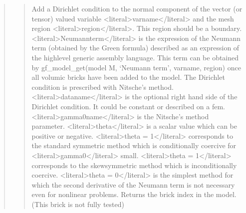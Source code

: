 \documentclass[a4paper,11pt,english]{sphinxmanual}
\begin{document}
\begin{quote}
\begin{quote}
\sphinxAtStartPar
Add a Dirichlet condition to the normal component of the vector
(or tensor) valued variable \textless{}literal\textgreater{}varname\textless{}/literal\textgreater{} and the mesh region \textless{}literal\textgreater{}region\textless{}/literal\textgreater{}.
This region should be a boundary. \textless{}literal\textgreater{}Neumannterm\textless{}/literal\textgreater{}
is the expression of the Neumann term (obtained by the Green formula)
described as an expression of the high\sphinxhyphen{}level
generic assembly language. This term can be obtained by
gf\_model\_get(model M, ‘Neumann term’, varname, region) once all volumic bricks have
been added to the model. The Dirichlet
condition is prescribed with Nitsche’s method. \textless{}literal\textgreater{}dataname\textless{}/literal\textgreater{} is the optional
right hand side of the Dirichlet condition. It could be constant or
described on a fem. \textless{}literal\textgreater{}gamma0name\textless{}/literal\textgreater{} is the
Nitsche’s method parameter. \textless{}literal\textgreater{}theta\textless{}/literal\textgreater{} is a scalar value which can be
positive or negative. \textless{}literal\textgreater{}theta = 1\textless{}/literal\textgreater{} corresponds to the standard symmetric
method which is conditionally coercive for  \textless{}literal\textgreater{}gamma0\textless{}/literal\textgreater{} small.
\textless{}literal\textgreater{}theta = \sphinxhyphen{}1\textless{}/literal\textgreater{} corresponds to the skew\sphinxhyphen{}symmetric method which is
inconditionally coercive. \textless{}literal\textgreater{}theta = 0\textless{}/literal\textgreater{} is the simplest method
for which the second derivative of the Neumann term is not necessary
even for nonlinear problems.
Returns the brick index in the model.
(This brick is not fully tested)
\end{quote}

\sphinxAtStartPar
{}
\begin{quote}


\end{quote}
\end{quote}
\end{document}
